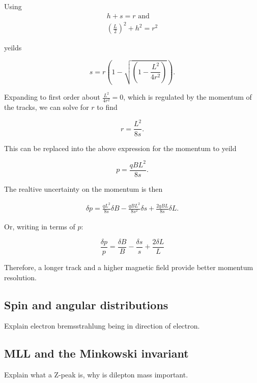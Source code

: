     Using 
    \begin{align*}
      h+ s = r \text{ and} \\
      \left(\frac{L}{2}\right)^2 + h^2 = r^2
    \end{align*}

    yeilds

    \[
      s = r\left(1 - \sqrt{\left(1-\frac{L^2}{4r^2}\right)} \right).
    \]

    Expanding to first order about $\frac{L^2}{4r^2} = 0$, which is regulated by the momentum of the tracks, we can solve for $r$ to find

    \[
      r = \frac{L^2}{8s}.
    \]

    This can be replaced into the above expression for the momentum to yeild

    \[
      p=\frac{qBL^2}{8s}.
    \]

    The realtive uncertainty on the momentum is then

    \begin{align*}
      \delta p = \frac{q L^2}{8s} \delta B - \frac{qBL^2}{8s^2} \delta s + \frac{2qBL}{8s} \delta L.
    \end{align*}
    
    Or, writing in terms of $p$:

    \[
      \frac{\delta p}{p} = \frac{\delta B}{B} - \frac{\delta s}{s} + \frac{2 \delta L}{L} 
    \]

    Therefore, a longer track and a higher magnetic field provide better momentum resolution.

  \subsection*{Spin and angular distributions}
    Explain electron bremsstrahlung being in direction of electron.
  \subsection*{MLL and the Minkowski invariant}
    Explain what a Z-peak is, why is dilepton mass important.

